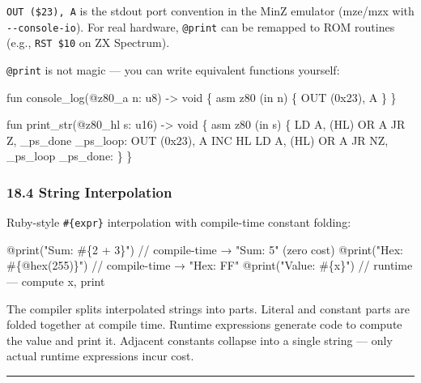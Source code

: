 \documentclass[
  11pt,
]{article}
\newenvironment{Shaded}{\begin{snugshade}}{\end{snugshade}}
\newcommand{\NormalTok}[1]{#1}
\begin{document}
\texttt{OUT\ (\$23),\ A} is the stdout port convention in the MinZ
emulator (mze/mzx with \texttt{-\/-console-io}). For real hardware,
\texttt{@print} can be remapped to ROM routines (e.g.,
\texttt{RST\ \$10} on ZX Spectrum).

\texttt{@print} is not magic --- you can write equivalent functions
yourself:

\begin{Shaded}
\begin{Highlighting}[]
\NormalTok{fun console\_log(@z80\_a n: u8) {-}\textgreater{} void \{}
\NormalTok{    asm z80 (in n) \{ OUT (0x23), A \}}
\NormalTok{\}}

\NormalTok{fun print\_str(@z80\_hl s: u16) {-}\textgreater{} void \{}
\NormalTok{    asm z80 (in s) \{}
\NormalTok{        LD A, (HL)}
\NormalTok{        OR A}
\NormalTok{        JR Z, \_ps\_done}
\NormalTok{\_ps\_loop:}
\NormalTok{        OUT (0x23), A}
\NormalTok{        INC HL}
\NormalTok{        LD A, (HL)}
\NormalTok{        OR A}
\NormalTok{        JR NZ, \_ps\_loop}
\NormalTok{\_ps\_done:}
\NormalTok{    \}}
\NormalTok{\}}
\end{Highlighting}
\end{Shaded}

\hypertarget{string-interpolation}{%
\subsubsection{18.4 String Interpolation}\label{string-interpolation}}

Ruby-style \texttt{\#\{expr\}} interpolation with compile-time constant
folding:

\begin{Shaded}
\begin{Highlighting}[]
\NormalTok{@print("Sum: \#\{2 + 3\}")          // compile{-}time → "Sum: 5" (zero cost)}
\NormalTok{@print("Hex: \#\{@hex(255)\}")      // compile{-}time → "Hex: FF"}
\NormalTok{@print("Value: \#\{x\}")            // runtime — compute x, print}
\end{Highlighting}
\end{Shaded}

The compiler splits interpolated strings into parts. Literal and
constant parts are folded together at compile time. Runtime expressions
generate code to compute the value and print it. Adjacent constants
collapse into a single string --- only actual runtime expressions incur
cost.

\begin{center}\rule{0.5\linewidth}{0.5pt}\end{center}
\end{document}
